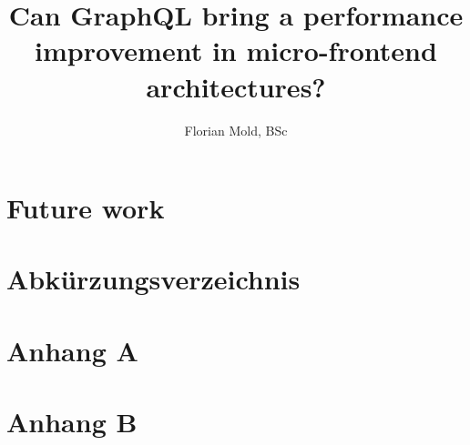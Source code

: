 \documentclass[MSE,Master,english]{twbook}%
\title{Can GraphQL bring a performance improvement in micro-frontend architectures?}
\author{Florian Mold, BSc}
\providecommand\listacroname{}
\renewcommand\listacroname{List of Abbreviations}
\renewcommand\listacroname{Abkürzungsverzeichnis}
\begin{document}
\maketitle












\chapter{Future work}

\chapter*{\listacroname}
\begin{acronym}[XXXXX]
\end{acronym}

%
%
\clearpage
\appendix
\chapter{Anhang A}
\clearpage
\chapter{Anhang B}
\end{document}
